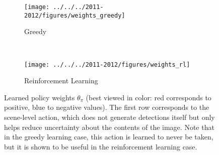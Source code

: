 \begin{figure}[h!]
\centering
\begin{subfigure}[t]{.8\linewidth}
    \texttt{[image: ../../../2011-2012/figures/weights\_greedy]}
    \caption{Greedy}
\end{subfigure}\\
\begin{subfigure}[t]{.8\linewidth}
    \texttt{[image: ../../../2011-2012/figures/weights\_rl]}
    \caption{Reinforcement Learning}
\end{subfigure}
\caption[Learned policy weights for the detection approach.]{
Learned policy weights $\theta_\pi$ (best viewed in color: red corresponds to positive, blue to negative values).
The first row corresponds to the scene-level action, which does not generate detections itself but only helps reduce uncertainty about the contents of the image.
Note that in the greedy learning case, this action is learned to never be taken, but it is shown to be useful in the reinforcement learning case.
}
\label{fig:det_weights}
\end{figure}
